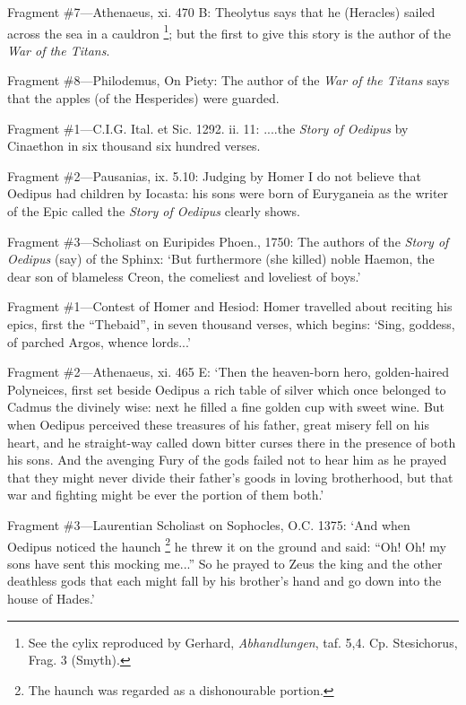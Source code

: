 Fragment \#7—Athenaeus, xi. 470 B: Theolytus says that he (Heracles)
sailed across the sea in a cauldron \footnote{See the cylix reproduced
by Gerhard, \emph{Abhandlungen}, taf. 5,4. Cp. Stesichorus, Frag. 3 (Smyth).}; but the
first to give this story is the author of the \emph{War of the Titans}.

Fragment \#8—Philodemus, On Piety: The author of the \emph{War of the
Titans} says that the apples (of the Hesperides) were guarded.


Fragment \#1—C.I.G. Ital. et Sic. 1292. ii. 11: ....the \emph{Story of
Oedipus} by Cinaethon in six thousand six hundred verses.

Fragment \#2—Pausanias, ix. 5.10: Judging by Homer I do not believe that
Oedipus had children by Iocasta: his sons were born of Euryganeia as the writer
of the Epic called the \emph{Story of Oedipus} clearly shows.

Fragment \#3—Scholiast on Euripides Phoen., 1750: The authors of the
\emph{Story of Oedipus} (say) of the Sphinx: ‘But furthermore (she
killed) noble Haemon, the dear son of blameless Creon, the comeliest and
loveliest of boys.’


Fragment \#1—Contest of Homer and Hesiod: Homer travelled about reciting
his epics, first the “Thebaid”, in seven thousand verses, which
begins: ‘Sing, goddess, of parched Argos, whence lords...’

Fragment \#2—Athenaeus, xi. 465 E: ‘Then the heaven-born hero,
golden-haired Polyneices, first set beside Oedipus a rich table of silver which
once belonged to Cadmus the divinely wise: next he filled a fine golden cup
with sweet wine. But when Oedipus perceived these treasures of his father,
great misery fell on his heart, and he straight-way called down bitter curses
there in the presence of both his sons. And the avenging Fury of the gods
failed not to hear him as he prayed that they might never divide their
father’s goods in loving brotherhood, but that war and fighting might be
ever the portion of them both.’

Fragment \#3—Laurentian Scholiast on Sophocles, O.C. 1375: ‘And when
Oedipus noticed the haunch \footnote{The haunch was regarded as
a dishonourable portion.} he threw it on the ground and
said: “Oh! Oh! my sons have sent this mocking me...” So he prayed
to Zeus the king and the other deathless gods that each might fall by his
brother’s hand and go down into the house of Hades.’

